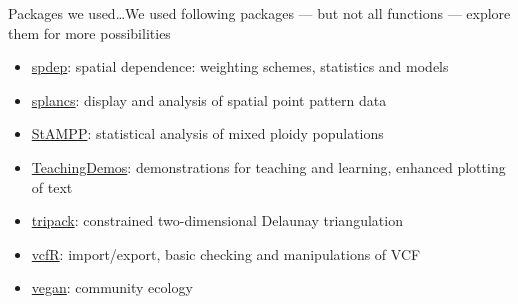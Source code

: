 \documentclass[compress, ucs, xelatex, 11pt, xcolor=svgnames, aspectratio=169,
	hyperref={
		bookmarks=true,
		unicode=true,
		colorlinks=true,
		pdftitle={Molecular data in R},
		plainpages=false,
		pdfauthor={Vojtech Zeisek},
		pdfsubject={Course about phylogeny and evolution in R},
		pdfcreator={XeLaTeX},
		pdfkeywords={R, evolution, phylogeny, molecular data},
		linkcolor=Crimson, %
		anchorcolor=Magenta, %
		citecolor=Magenta, %
		filecolor=Magenta, %
		menucolor=Magenta, %
		urlcolor=DodgerBlue, %
		pdftex},
	url={hyphens, lowtilde} %
	]{beamer}
\begin{document}
\begin{frame}[allowframebreaks]{Packages we used\ldots}{We used following packages --- but not all functions --- explore them for more possibilities}
\begin{itemize}
		\item \href{https://CRAN.R-project.org/package=spdep}{spdep}: spatial dependence: weighting schemes, statistics and models
		\item \href{https://CRAN.R-project.org/package=splancs}{splancs}: display and analysis of spatial point pattern data
		\item \href{https://CRAN.R-project.org/package=StAMPP}{StAMPP}: statistical analysis of mixed ploidy populations
		\item \href{https://CRAN.R-project.org/package=TeachingDemos}{TeachingDemos}: demonstrations for teaching and learning, enhanced plotting of text
		\item \href{https://CRAN.R-project.org/package=tripack}{tripack}: constrained two-dimensional Delaunay triangulation
		\item \href{https://CRAN.R-project.org/package=vcfR}{vcfR}: import/export, basic checking and manipulations of VCF
		\item \href{https://CRAN.R-project.org/package=vegan}{vegan}: community ecology
	\end{itemize}
\end{frame}
\end{document}

